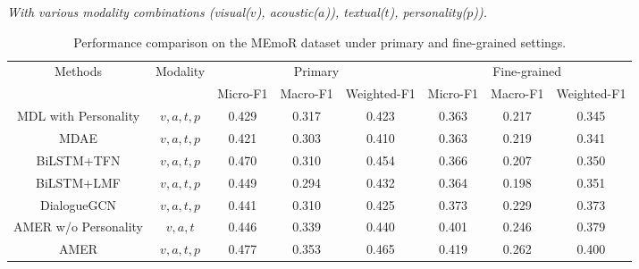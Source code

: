 \begin{table*}[t!]
\begin{center}
\caption{Performance comparison on the MEmoR dataset under primary and fine-grained settings.}
\vspace{-1em}
\parbox{\textwidth}{\centering \small \em With various modality combinations (visual($v$), acoustic($a$)), textual($t$), personality($p$)).}  
\vspace{-1em}
\label{tab:primary} 
\resizebox{0.95\textwidth}{!} %
{ 
\begin{tabular}{cc|ccc|ccc}
\hline
\hline
\multirow{2}{*}{Methods} 
& \multirow{2}{*}{Modality} 
& \multicolumn{3}{c|}{Primary}       
& \multicolumn{3}{c}{Fine-grained}  \\ 
\cline{3-8} 

&                           
& Micro-F1 & Macro-F1 & Weighted-F1 
& Micro-F1 & Macro-F1 & Weighted-F1 
\\ 
\hline

MDL with Personality     & $v,a,t,p$                   
& 0.429    & 0.317    & 0.423       
& 0.363    & 0.217    & 0.345       
\\

MDAE                    & $v,a,t,p$                   
& 0.421    & 0.303    & 0.410       
& 0.363    & 0.219    & 0.341       
\\

BiLSTM+TFN             & $v,a,t,p$                   
& 0.470    & 0.310    & 0.454       
& 0.366    & 0.207    & 0.350       
\\

BiLSTM+LMF             & $v,a,t,p$                   
&0.449    & 0.294    & 0.432       
& 0.364    & 0.198    & 0.351       
\\

DialogueGCN            & $v,a,t,p$                   
& 0.441    & 0.310    & 0.425       
& 0.373    & 0.229    & 0.373       
\\

AMER w/o Personality     & $v,a,t$                     
& 0.446    & 0.339    & 0.440       
& 0.401    & 0.246    & 0.379       
\\

AMER                & $v,a,t,p$                   
& 0.477    & 0.353    & 0.465       
& 0.419    & 0.262    & 0.400       
\\ 


\end{tabular}}
\end{center}
\end{table*}
